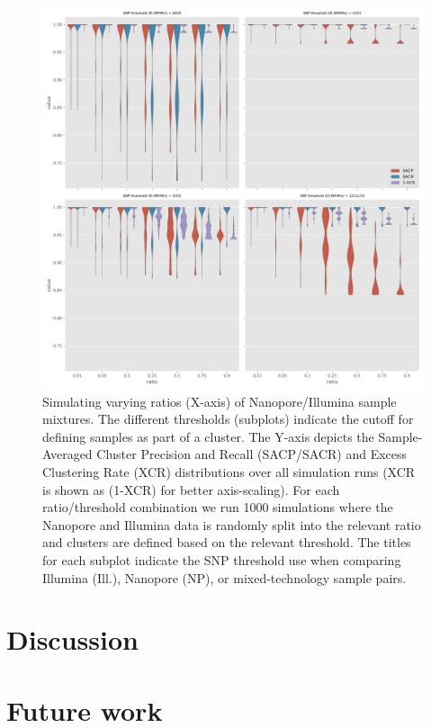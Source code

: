\begin{figure}
\begin{center}
\includegraphics[width=0.90\columnwidth]{Chapter2/Figs/mixed_simulations.png}
\caption{{Simulating varying ratios (X-axis) of Nanopore/Illumina sample mixtures.
The different thresholds (subplots) indicate the cutoff for defining
samples as part of a cluster. The Y-axis depicts the Sample-Averaged
Cluster Precision and Recall (SACP/SACR) and Excess Clustering Rate
(XCR) distributions over all simulation runs (XCR is shown as (1-XCR)
for better axis-scaling). For each ratio/threshold combination we run
1000 simulations where the Nanopore and Illumina data is randomly split
into the relevant ratio and clusters are defined based on the relevant
threshold. The titles for each subplot indicate the SNP threshold use
when comparing Illumina (Ill.), Nanopore (NP), or mixed-technology
sample pairs.
{\label{571244}}%
}}
\end{center}
\end{figure}

\section{Discussion}



\section{Future work}


